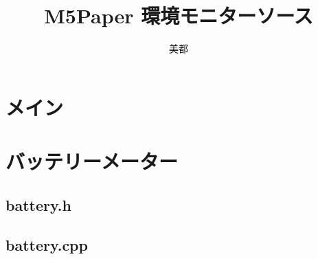 \documentclass[a4paper, 10pt]{ltjsarticle}
\title{M5Paper 環境モニターソース}
\author{美都}
\begin{document}
\maketitle
\tableofcontents
\clearpage

\section {メイン}

\clearpage
\section {バッテリーメーター}
\subsection {battery.h}

\subsection {battery.cpp}

\end{document}
